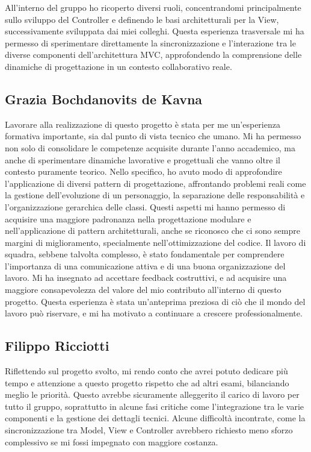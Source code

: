 \documentclass[a4paper,12pt]{report}
\begin{document}
All'interno del gruppo ho ricoperto diversi ruoli, concentrandomi principalmente sullo sviluppo del Controller e definendo le basi architetturali per la View, successivamente sviluppata dai miei colleghi. Questa esperienza trasversale mi ha permesso di sperimentare direttamente la sincronizzazione e l'interazione tra le diverse componenti dell'architettura MVC, approfondendo la comprensione delle dinamiche di progettazione in un contesto collaborativo reale.

\subsection{Grazia Bochdanovits de Kavna}
Lavorare alla realizzazione di questo progetto è stata per me un'esperienza formativa importante, sia dal punto di vista tecnico che umano.
Mi ha permesso non solo di consolidare le competenze acquisite durante l'anno accademico, ma anche di sperimentare dinamiche lavorative e progettuali che vanno oltre il contesto puramente teorico.
Nello specifico, ho avuto modo di approfondire l'applicazione di diversi pattern di progettazione, affrontando problemi reali come la gestione dell'evoluzione di un personaggio, la separazione delle
responsabilità e l'organizzazione gerarchica delle classi. Questi aspetti mi hanno permesso di acquisire una maggiore padronanza nella progettazione modulare e nell'applicazione di pattern architetturali, anche se riconosco che ci sono
sempre margini di miglioramento, specialmente nell'ottimizzazione del codice.
Il lavoro di squadra, sebbene talvolta complesso, è stato fondamentale per comprendere l'importanza di una comunicazione attiva e di una buona organizzazione del lavoro.
Mi ha insegnato ad accettare feedback costruttivi, e ad acquisire una maggiore consapevolezza del valore del mio contributo all'interno di questo progetto.
Questa esperienza è stata un'anteprima preziosa di ciò che il mondo del lavoro può riservare, e mi ha motivato a continuare a crescere professionalmente.

\newpage
\subsection{Filippo Ricciotti}
Riflettendo sul progetto svolto, mi rendo conto che avrei potuto dedicare più tempo e attenzione a questo progetto rispetto che ad altri esami, bilanciando meglio le priorità. Questo
avrebbe sicuramente alleggerito il carico di lavoro per tutto il gruppo, soprattutto in alcune fasi critiche come l'integrazione tra le varie componenti e la gestione dei dettagli
tecnici. Alcune difficoltà incontrate, come la sincronizzazione tra Model, View e Controller avrebbero richiesto meno sforzo complessivo se mi fossi impegnato con maggiore costanza.
\end{document}
